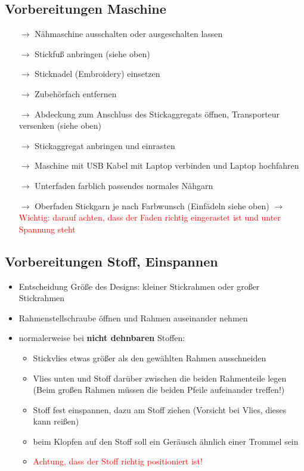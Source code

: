 \documentclass{\basedir/fablab-document}
\begin{document}
\subsection{Vorbereitungen Maschine}
\begin{itemize}
 \item[$\rightarrow$] Nähmaschine ausschalten oder ausgeschalten lassen
 \item[$\rightarrow$] Stickfuß anbringen (siehe oben)
 \item[$\rightarrow$] Sticknadel (Embroidery) einsetzen
 \item[$\rightarrow$] Zubehörfach entfernen
 \item[$\rightarrow$] Abdeckung zum Anschluss des Stickaggregats öffnen, Transporteur versenken (siehe oben)
 \item[$\rightarrow$] Stickaggregat anbringen und einrasten
 \item[$\rightarrow$] Maschine mit USB Kabel mit Laptop verbinden und Laptop hochfahren
 \item[$\rightarrow$] Unterfaden farblich passendes normales Nähgarn
 \item[$\rightarrow$] Oberfaden Stickgarn je nach Farbwunsch (Einfädeln siehe oben) $\rightarrow$ \textcolor{red}{Wichtig: darauf achten, dass der Faden richtig eingerastet ist und unter Spannung steht}
\end{itemize}

\subsection{Vorbereitungen Stoff, Einspannen}
\begin{itemize}
 \item Entscheidung Größe des Designs: kleiner Stickrahmen oder großer Stickrahmen
 \item Rahmenstellschraube öffnen und Rahmen auseinander nehmen
 \item normalerweise bei \textbf{nicht dehnbaren} Stoffen:
	\begin{itemize}
	 \item Stickvlies etwas größer als den gewählten Rahmen ausschneiden
	 \item Vlies unten und Stoff darüber zwischen die beiden Rahmenteile legen (Beim großen Rahmen müssen die beiden Pfeile aufeinander treffen!)
	 \item Stoff fest einspannen, dazu am Stoff ziehen (Vorsicht bei Vlies, dieses kann reißen)
	 \item beim Klopfen auf den Stoff soll ein Geräusch ähnlich einer Trommel sein
	 \item \textcolor{red}{Achtung, dass der Stoff richtig positioniert ist!} 
	\end{itemize}
\end{itemize} 
\end{document}

